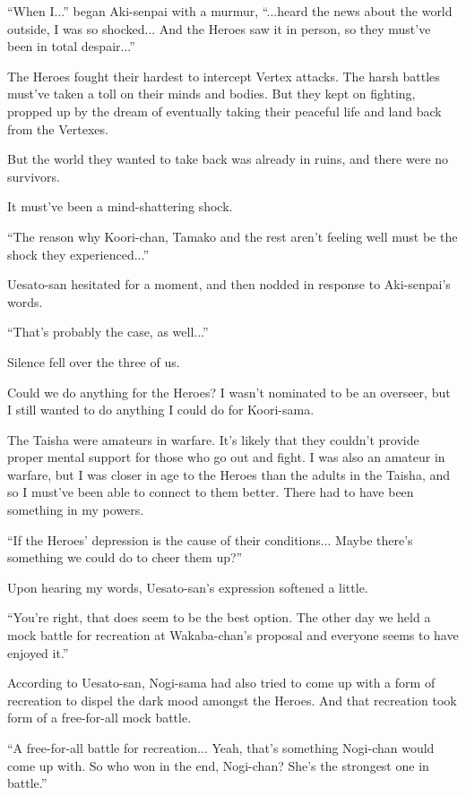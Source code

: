 ``When I...'' began Aki-senpai with a murmur, ``...heard the news about the world outside, I was so shocked... And the Heroes saw it in person, so they must've been in total despair...''

The Heroes fought their hardest to intercept Vertex attacks. The harsh battles must've taken a toll on their minds and bodies. But they kept on fighting, propped up by the dream of eventually taking their peaceful life and land back from the Vertexes.

But the world they wanted to take back was already in ruins, and there were no survivors.

It must've been a mind-shattering shock.

``The reason why Koori-chan, Tamako and the rest aren't feeling well must be the shock they experienced...''

Uesato-san hesitated for a moment, and then nodded in response to Aki-senpai's words.

``That's probably the case, as well...''

Silence fell over the three of us.

Could we do anything for the Heroes? I wasn't nominated to be an overseer, but I still wanted to do anything I could do for Koori-sama.

The Taisha were amateurs in warfare. It's likely that they couldn't provide proper mental support for those who go out and fight. I was also an amateur in warfare, but I was closer in age to the Heroes than the adults in the Taisha, and so I must've been able to connect to them better. There had to have been something in my powers.

``If the Heroes' depression is the cause of their conditions... Maybe there's something we could do to cheer them up?''

Upon hearing my words, Uesato-san's expression softened a little.

``You're right, that does seem to be the best option. The other day we held a mock battle for recreation at Wakaba-chan's proposal and everyone seems to have enjoyed it.''

According to Uesato-san, Nogi-sama had also tried to come up with a form of recreation to dispel the dark mood amongst the Heroes. And that recreation took form of a free-for-all mock battle.

``A free-for-all battle for recreation... Yeah, that's something Nogi-chan would come up with. So who won in the end, Nogi-chan? She's the strongest one in battle.''

